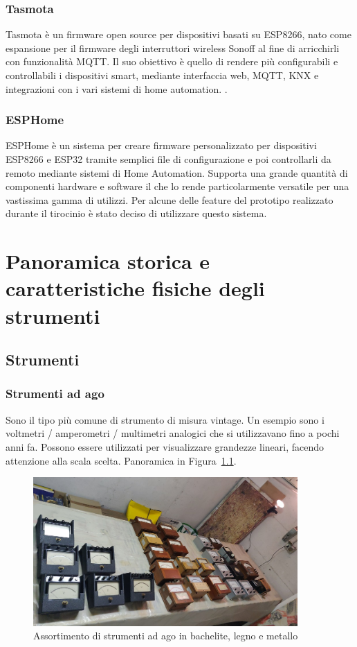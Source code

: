 \documentclass[12pt,a4paper]{report}
\begin{document}
\subsection{Tasmota}
Tasmota è un firmware open source per dispositivi basati su ESP8266, nato come espansione per il firmware degli interruttori
wireless Sonoff al fine di arricchirli con funzionalità MQTT. Il suo obiettivo è quello di rendere più configurabili e controllabili i dispositivi
smart, mediante interfaccia web, MQTT, KNX e integrazioni con i vari sistemi di home automation.
\cite{abouttasmota}.

\subsection{ESPHome}
ESPHome è un sistema per creare firmware personalizzato per dispositivi ESP8266 e ESP32 tramite semplici file di configurazione e poi controllarli
da remoto mediante sistemi di Home Automation.
Supporta una grande quantità di componenti hardware e software il che lo rende particolarmente versatile per una vastissima gamma di utilizzi.
\cite{esphomeio}
Per alcune delle feature del prototipo realizzato durante il tirocinio è stato deciso di utilizzare questo sistema.


\chapter{Panoramica storica e caratteristiche fisiche degli strumenti}

\section{Strumenti}
\subsection{Strumenti ad ago}
Sono il tipo più comune di strumento di misura vintage. Un esempio sono i voltmetri / amperometri / multimetri analogici che si utilizzavano
fino a pochi anni fa. Possono essere utilizzati per visualizzare grandezze lineari, facendo attenzione alla scala scelta.
Panoramica in Figura~\ref{fig:strumentiago}.
\begin{figure}[h]
  \centering
  \includegraphics[width=0.9\textwidth]{strumentiago}
  \caption{Assortimento di strumenti ad ago in bachelite, legno e metallo}
  \label{fig:strumentiago}
\end{figure}
\end{document}
